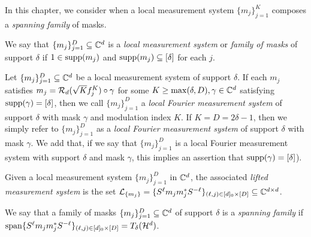 In this chapter, we consider when a local measurement system $\{m_j\}_{j = 1}^K$ composes a \emph{spanning family} of masks.

\begin{definition}
  We say that $\{m_j\}_{j = 1}^D \subseteq \mathbb{C}^d$ is a \emph{local measurement system} or \emph{family of masks} of support $\delta$ if $1 \in \operatorname{supp}(m_j)$ and $\operatorname{supp}(m_j) \subseteq [\delta]$ for each $j$. \label{def:loc_meas}
\end{definition}

\begin{definition}
  Let $\{m_j\}_{j = 1}^D \subseteq \mathbb{C}^d$ be a local measurement system of support $\delta$.  If each $m_j$ satisfies $m_j = \mathcal{R}_d(\sqrt{K} f_j^K) \circ \gamma$ for some $K \ge \max(\delta, D), \gamma \in \mathbb{C}^d$ satisfying $\operatorname{supp}(\gamma) = [\delta]$, then we call $\{m_j\}_{j = 1}^D$ a \emph{local Fourier measurement system} of support $\delta$ with mask $\gamma$ and modulation index $K$.  If $K = D = 2 \delta - 1$, then we simply refer to $\{m_j\}_{j = 1}^D$ as a \emph{local Fourier measurement system} of support $\delta$ with mask $\gamma$.  We add that, if we say that $\{m_j\}_{j = 1}^D$ is a local Fourier measurement system with support $\delta$ and mask $\gamma$, this implies an assertion that $\operatorname{supp}(\gamma) = [\delta]$). \label{def:loc_four_meas}
\end{definition}

\begin{definition}
  Given a local measurement system $\{m_j\}_{j = 1}^D$ in $\mathbb{C}^d$, the associated \emph{lifted measurement system} is the set $\mathcal{L}_{\{m_j\}} = \{S^{\ell} m_j m_j^* S^{- \ell}\}_{(\ell, j) \in [d]_0 \times [D]} \subseteq \mathbb{C}^{d \times d}$. \label{def:lifted_meas}
\end{definition}

\begin{definition}
  We say that a family of masks $\{m_j\}_{j = 1}^D \subseteq \mathbb{C}^d$ of support $\delta$ is a \emph{spanning family} if $\operatorname{span} \{S^\ell m_j m_j^* S^{-\ell}\}_{(\ell, j) \in [d]_0 \times [D]} = T_\delta(\mathcal{H}^d)$. \label{def:span_fam}
\end{definition}

